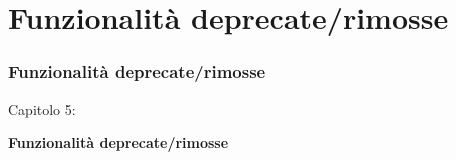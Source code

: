 %

\section{Funzionalità deprecate/rimosse}
\begin{frame}[fragile]
	\frametitle{Funzionalità deprecate/rimosse}

	\begin{center}\huge{Capitolo 5:}\end{center}
	\begin{center}\huge{\color{typo3darkgrey}\textbf{Funzionalità deprecate/rimosse}}\end{center}

\end{frame}


